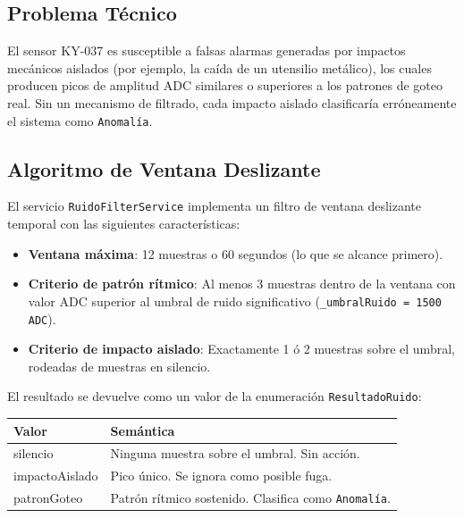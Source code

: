 \documentclass[12pt,a4paper]{article}
\begin{document}
\subsection{Problema Técnico}

El sensor KY-037 es susceptible a falsas alarmas generadas por impactos mecánicos aislados (por ejemplo, la caída de un utensilio metálico), los cuales producen picos de amplitud ADC similares o superiores a los patrones de goteo real. Sin un mecanismo de filtrado, cada impacto aislado clasificaría erróneamente el sistema como \texttt{Anomalía}.

\subsection{Algoritmo de Ventana Deslizante}

El servicio \texttt{RuidoFilterService} implementa un filtro de ventana deslizante temporal con las siguientes características:

\begin{itemize}[noitemsep]
    \item \textbf{Ventana máxima}: 12 muestras o 60 segundos (lo que se alcance primero).
    \item \textbf{Criterio de patrón rítmico}: Al menos 3 muestras dentro de la ventana con valor ADC superior al umbral de ruido significativo (\texttt{\_umbralRuido = 1500 ADC}).
    \item \textbf{Criterio de impacto aislado}: Exactamente 1 ó 2 muestras sobre el umbral, rodeadas de muestras en silencio.
\end{itemize}

El resultado se devuelve como un valor de la enumeración \texttt{ResultadoRuido}:

\begin{center}
\begin{tabularx}{0.88\textwidth}{>{\ttfamily}lX}
    \toprule
    \textbf{Valor} & \textbf{Semántica} \\
    \midrule
    silencio       & Ninguna muestra sobre el umbral. Sin acción. \\
    impactoAislado & Pico único. Se ignora como posible fuga. \\
    patronGoteo    & Patrón rítmico sostenido. Clasifica como \texttt{Anomalía}. \\
    \bottomrule
\end{tabularx}
\end{center}
\end{document}

